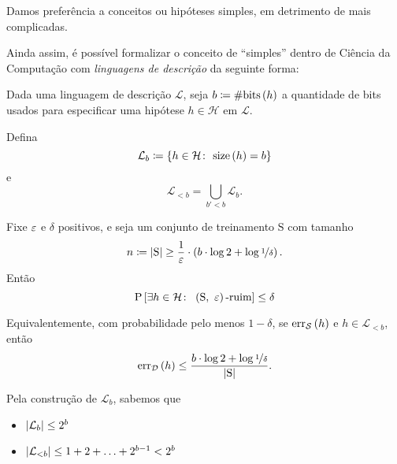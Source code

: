 \begin{afirmacao}
  \label{afr:navalha_de_occam}
  Damos preferência a conceitos ou hipóteses simples, em detrimento de mais complicadas.
\end{afirmacao}

Ainda assim, é possível formalizar o conceito de ``simples'' dentro de Ciência da Computação com \textit{linguagens de descrição} da seguinte forma:
\begin{teorema}
  \label{teo:navalha_de_occam}
  Dada uma linguagem de descrição $\mathcal{L}$, seja $b\coloneqq\#\mathrm{bits}\left(h\vphantom{1j}\right)$ a quantidade de bits usados para especificar uma hipótese $h\in\mathcal{H}$ em $\mathcal{L}$.

  Defina
  \[
    \mathcal{L}_b\coloneqq\left\{h\in\mathcal{H}\colon\ \mathrm{size}\left(h\vphantom{1j}\right)=b\vphantom{1j}\right\}
  \]
  e
  \[ 
    \mathcal{L}_{<b} = \bigcup_{b'<b} \mathcal{L}_b.
  \]

  Fixe $\varepsilon$ e $\delta$ positivos, e seja um conjunto de treinamento $\mathrm{S}$ com tamanho
  \[
    n \coloneqq \left|\mathrm{S}\vphantom{1j}\right| \geq \frac{1}{\varepsilon}\cdot\left(b\cdot\log2 + \log\nicefrac{1}{\delta}\vphantom{1j}\right).
  \]
  Então
  \[
    \mathrm{P}\left[\exists h\in\mathcal{H}\colon\ \left(\mathrm{S},\ \eps\vphantom{1j}\right)\text{-ruim}\vphantom{1j}\right] \leq \delta
  \]

  Equivalentemente, com probabilidade pelo menos $1-\delta$, se $\mathrm{err}_\mathcal{S}\left(h\vphantom{1j}\right)$ e $h\in\mathcal{L}_{<b}$, então
  \[
    \mathrm{err}_\mathcal{D}\left(h\vphantom{1j}\right) \leq \frac{b\cdot\log2 + \log\nicefrac{1}{\delta}}{\left|\mathrm{S}\vphantom{1j}\right|}.
  \]
\end{teorema}

\begin{observacao}
  Pela construção de $\mathcal{L}_b$, sabemos que
  \begin{itemize}
    \item $\left|\mathcal{L}_b\vphantom{1j}\right| \leq 2^b$
    \item $\left|\mathcal{L}_{<b}\vphantom{1j}\right| \leq 1 + 2 + \ldots + 2^{b-1} < 2^b$
  \end{itemize}
\end{observacao}

